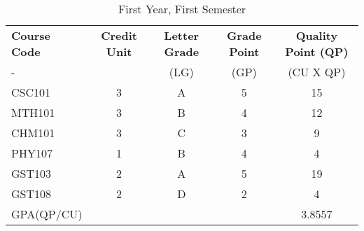 \documentclass{article}
\begin{document}
	\begin{table}[h!]
		\begin{center}
			\caption{First Year, First Semester}
			\label{tab:table1}
			\begin{tabular}{l|c|c|c|c}
				\hline
				\cellcolor{red!35}\textbf{Course Code} & \cellcolor{red!35}\textbf{Credit Unit} & \cellcolor{red!35}\textbf{Letter Grade} & \cellcolor{red!35}\textbf{Grade Point} & \cellcolor{red!35}\textbf{Quality Point (QP)}\\
				\cellcolor{blue!20}- & \cellcolor{blue!40}{CU} & \cellcolor{blue!20}(LG) & \cellcolor{blue!40}(GP) & \cellcolor{blue!20}(CU X QP)\\
				\hline
				\cellcolor{blue!40}CSC101 & 3 & A & 5 & 15\\
				\cellcolor{blue!20}MTH101 & 3 & B & 4 & 12\\
				\cellcolor{blue!40}CHM101 & 3 & C & 3 & 9\\
				\cellcolor{blue!20}PHY107 & 1 & B & 4 & 4\\
				\cellcolor{blue!40}GST103 & 2 & A & 5 & 19\\
				\cellcolor{blue!20}GST108 & 2 & D & 2 & 4\\
				\hline
				\cellcolor{yellow!35}GPA(QP/CU) & \cellcolor{yellow!35} & \cellcolor{yellow!35} & \cellcolor{yellow!35} & \cellcolor{yellow!35}3.8557\\
				\hline
			\end{tabular}
		\end{center}
	\end{table}
\end{document}
